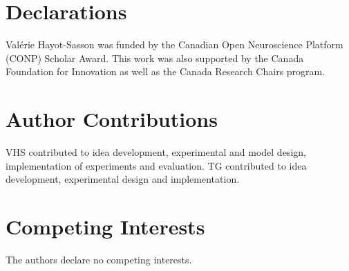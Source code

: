 \documentclass[pdflatex,sn-mathphys-num]{sn-jnl}
\theoremstyle{thmstyleone}%
\theoremstyle{thmstyletwo}%
\theoremstyle{thmstylethree}%
\begin{document}
    \section*{Declarations}
    Val\'erie Hayot-Sasson was funded by the Canadian Open
    Neuroscience Platform (CONP) Scholar Award. This work
    was also supported by the Canada Foundation for Innovation as well as the Canada Research Chairs program.

    \section*{Author Contributions}
    VHS contributed to idea development, experimental and model design, implementation of experiments and
    evaluation. TG contributed to idea development, experimental design and implementation.

    \section*{Competing Interests}
    The authors declare no competing interests.

    
\end{document}
